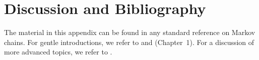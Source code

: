 \section{Discussion and Bibliography}
\label{sec:A.7}

The material in this appendix can be found in any standard reference on Markov chains.  For
gentle introductions, we refer to \cite{175, 35} and \cite{135} (Chapter~1).  For a
discussion of more advanced topics, we refer to \cite{164, 57, 176}.
